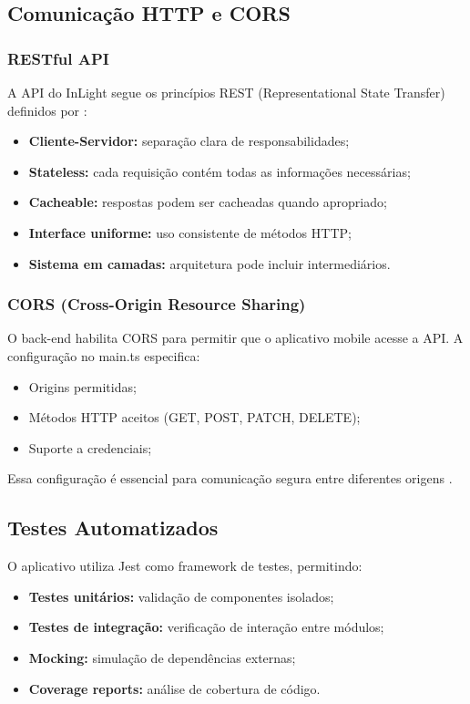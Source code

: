 \subsection{Comunicação HTTP e CORS}

\subsubsection{RESTful API}

A API do InLight segue os princípios REST (Representational State Transfer) definidos por \cite{fielding2000}:

\begin{itemize}
    \item \textbf{Cliente-Servidor:} separação clara de responsabilidades;
    \item \textbf{Stateless:} cada requisição contém todas as informações necessárias;
    \item \textbf{Cacheable:} respostas podem ser cacheadas quando apropriado;
    \item \textbf{Interface uniforme:} uso consistente de métodos HTTP;
    \item \textbf{Sistema em camadas:} arquitetura pode incluir intermediários.
\end{itemize}

\subsubsection{CORS (Cross-Origin Resource Sharing)}

O back-end habilita CORS para permitir que o aplicativo mobile acesse a API. A configuração no main.ts especifica:

\begin{itemize}
    \item Origins permitidas;
    \item Métodos HTTP aceitos (GET, POST, PATCH, DELETE);
    \item Suporte a credenciais;
\end{itemize}

Essa configuração é essencial para comunicação segura entre diferentes origens \cite{w3c2014}.
\subsection{Testes Automatizados}
O aplicativo utiliza Jest como framework de testes, permitindo:

\begin{itemize}
    \item \textbf{Testes unitários:} validação de componentes isolados;
    \item \textbf{Testes de integração:} verificação de interação entre módulos;
    \item \textbf{Mocking:} simulação de dependências externas;
    \item \textbf{Coverage reports:} análise de cobertura de código.
\end{itemize}

